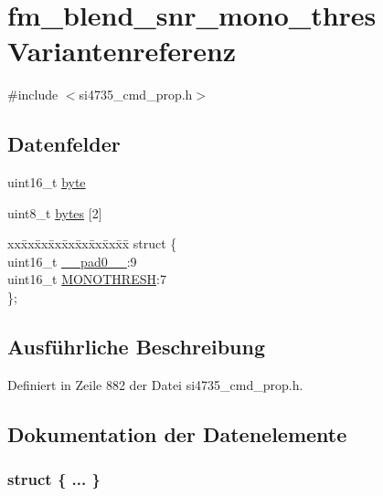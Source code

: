 \hypertarget{unionfm__blend__snr__mono__thres}{}\section{fm\+\_\+blend\+\_\+snr\+\_\+mono\+\_\+thres Variantenreferenz}
\label{unionfm__blend__snr__mono__thres}


{\ttfamily \#include $<$si4735\+\_\+cmd\+\_\+prop.\+h$>$}

\subsection*{Datenfelder}
\begin{DoxyCompactItemize}
\item 
uint16\+\_\+t \hyperlink{unionfm__blend__snr__mono__thres_ab0549c1b5ea980a02e7eab77e21fea49}{byte}
\item 
uint8\+\_\+t \hyperlink{unionfm__blend__snr__mono__thres_a46e4c05d20a047ec169f60d3167e912e}{bytes} \mbox{[}2\mbox{]}
\item 
\begin{tabbing}
xx\=xx\=xx\=xx\=xx\=xx\=xx\=xx\=xx\=\kill
struct \{\\
\>uint16\_t \hyperlink{unionfm__blend__snr__mono__thres_a77132c2c26a75f5b8751b235cda23828}{\_\_pad0\_\_}:9\\
\>uint16\_t \hyperlink{unionfm__blend__snr__mono__thres_a5de7498b6512934529d0c6284f120805}{MONOTHRESH}:7\\
\}; \\

\end{tabbing}\end{DoxyCompactItemize}


\subsection{Ausführliche Beschreibung}


Definiert in Zeile 882 der Datei si4735\+\_\+cmd\+\_\+prop.\+h.



\subsection{Dokumentation der Datenelemente}
\hypertarget{unionfm__blend__snr__mono__thres_aab0231f4504613893ed2aa174269bdd3}{}\subsubsection[{"@109}]{\setlength{\rightskip}{0pt plus 5cm}struct \{ ... \} }\label{unionfm__blend__snr__mono__thres_aab0231f4504613893ed2aa174269bdd3}
\hypertarget{unionfm__blend__snr__mono__thres_a77132c2c26a75f5b8751b235cda23828}{}
